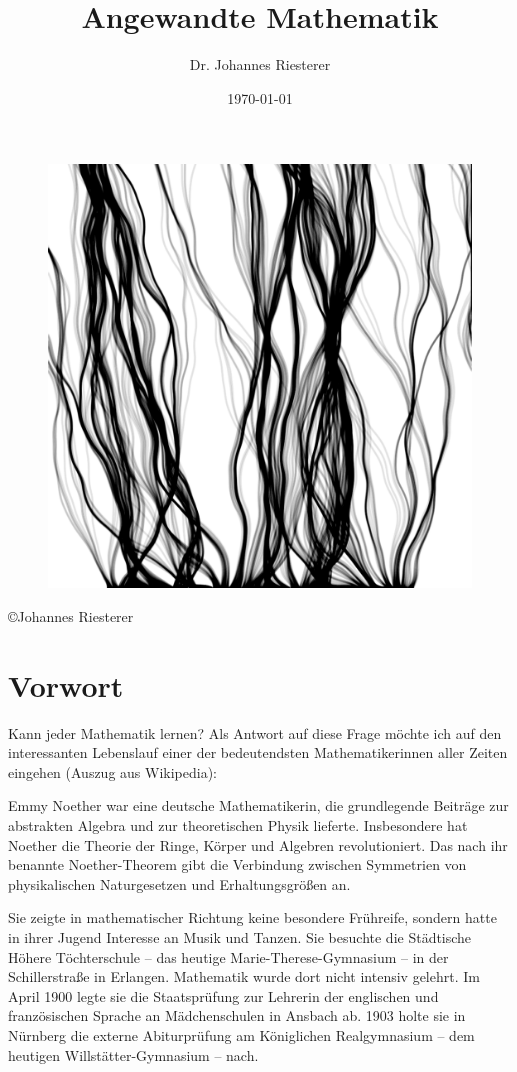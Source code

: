 \title{ Angewandte Mathematik}
\author{Dr. Johannes Riesterer}
\date{\today}
\maketitle\thispagestyle{empty}
 \begin{figure}[H]
    \centering
    \includegraphics[width=1.0 \textwidth]{images/cover.png}
    \label{fig:diffus}
\end{figure}
\newpage 
\begin{center}
\large
 \copyright Johannes Riesterer \\
\end{center}
\thispagestyle{empty}
\newpage

\section*{Vorwort}
Kann jeder Mathematik lernen? Als Antwort auf diese Frage möchte ich auf den interessanten Lebenslauf
einer der bedeutendsten Mathematikerinnen aller Zeiten eingehen  (Auszug aus Wikipedia):

Emmy Noether war eine deutsche Mathematikerin, die grundlegende Beiträge zur abstrakten Algebra und zur theoretischen Physik lieferte. Insbesondere hat Noether die Theorie der Ringe, Körper und Algebren revolutioniert. Das nach ihr benannte Noether-Theorem gibt die Verbindung zwischen Symmetrien von physikalischen Naturgesetzen und Erhaltungsgrößen an. 

Sie zeigte in mathematischer Richtung keine besondere Frühreife, sondern hatte in ihrer Jugend Interesse an Musik und Tanzen. Sie besuchte die Städtische Höhere Töchterschule – das heutige Marie-Therese-Gymnasium – in der Schillerstraße in Erlangen. Mathematik wurde dort nicht intensiv gelehrt. Im April 1900 legte sie die Staatsprüfung zur Lehrerin der englischen und französischen Sprache an Mädchenschulen in Ansbach ab. 1903 holte sie in Nürnberg die externe Abiturprüfung am Königlichen Realgymnasium – dem heutigen Willstätter-Gymnasium – nach. 


\newpage
